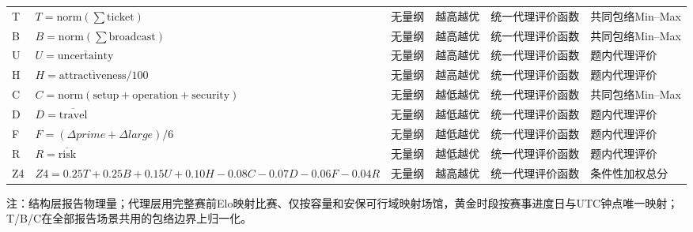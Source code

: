 {\begin{longtable}{@{}p{}p{}p{}p{}p{}p{}@{}}
T & $T=\mathrm{norm}(\sum \mathrm{ticket})$ & 无量纲 & 越高越优 & 统一代理评价函数 & 共同包络Min--Max \\
B & $B=\mathrm{norm}(\sum \mathrm{broadcast})$ & 无量纲 & 越高越优 & 统一代理评价函数 & 共同包络Min--Max \\
U & $U=\overline{\mathrm{uncertainty}}$ & 无量纲 & 越高越优 & 统一代理评价函数 & 题内代理评价 \\
H & $H=\overline{\mathrm{attractiveness}}/100$ & 无量纲 & 越高越优 & 统一代理评价函数 & 题内代理评价 \\
C & $C=\mathrm{norm}(\mathrm{setup+operation+security})$ & 无量纲 & 越低越优 & 统一代理评价函数 & 共同包络Min--Max \\
D & $D=\overline{\mathrm{travel}}$ & 无量纲 & 越低越优 & 统一代理评价函数 & 题内代理评价 \\
F & $F=(\Delta prime+\Delta large)/6$ & 无量纲 & 越低越优 & 统一代理评价函数 & 题内代理评价 \\
R & $R=\overline{\mathrm{risk}}$ & 无量纲 & 越低越优 & 统一代理评价函数 & 题内代理评价 \\
Z4 & $Z4=0.25T+0.25B+0.15U+0.10H-0.08C-0.07D-0.06F-0.04R$ & 无量纲 & 越高越优 & 统一代理评价函数 & 条件性加权总分 \\
\end{longtable}
\noindent\begin{minipage}{0.96\textwidth}\footnotesize 注：结构层报告物理量；代理层用完整赛前Elo映射比赛、仅按容量和安保可行域映射场馆，黄金时段按赛事进度日与UTC钟点唯一映射；T/B/C在全部报告场景共用的包络边界上归一化。\end{minipage}
\par
}
